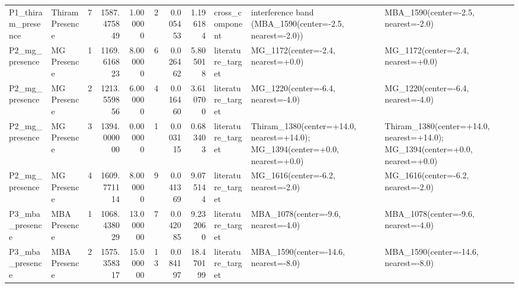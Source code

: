 \begin{tabular}{llrrrrrrlll}
P1_thiram_presence & Thiram Presence & 7 & 1587.475849 & 1.000000 & 2 & 0.005453 & 1.196184 & cross_component & interference band (MBA_1590(center=-2.5, nearest=-2.0)) & MBA_1590(center=-2.5, nearest=-2.0) \\
P2_mg_presence & MG Presence & 1 & 1169.616823 & 8.000000 & 6 & 0.026462 & 5.805018 & literature_target & MG_1172(center=-2.4, nearest=+0.0) & MG_1172(center=-2.4, nearest=+0.0) \\
P2_mg_presence & MG Presence & 2 & 1213.559856 & 6.000000 & 4 & 0.016460 & 3.610700 & literature_target & MG_1220(center=-6.4, nearest=-4.0) & MG_1220(center=-6.4, nearest=-4.0) \\
P2_mg_presence & MG Presence & 3 & 1394.000000 & 0.000000 & 1 & 0.003115 & 0.683403 & literature_target & Thiram_1380(center=+14.0, nearest=+14.0); MG_1394(center=+0.0, nearest=+0.0) & Thiram_1380(center=+14.0, nearest=+14.0); MG_1394(center=+0.0, nearest=+0.0) \\
P2_mg_presence & MG Presence & 4 & 1609.771114 & 8.000000 & 9 & 0.041369 & 9.075144 & literature_target & MG_1616(center=-6.2, nearest=-2.0) & MG_1616(center=-6.2, nearest=-2.0) \\
P3_mba_presence & MBA Presence & 1 & 1068.438029 & 13.000000 & 7 & 0.042085 & 9.232060 & literature_target & MBA_1078(center=-9.6, nearest=-4.0) & MBA_1078(center=-9.6, nearest=-4.0) \\
P3_mba_presence & MBA Presence & 2 & 1575.358317 & 15.000000 & 13 & 0.084197 & 18.470199 & literature_target & MBA_1590(center=-14.6, nearest=-8.0) & MBA_1590(center=-14.6, nearest=-8.0) \\
\bottomrule
\end{tabular}
